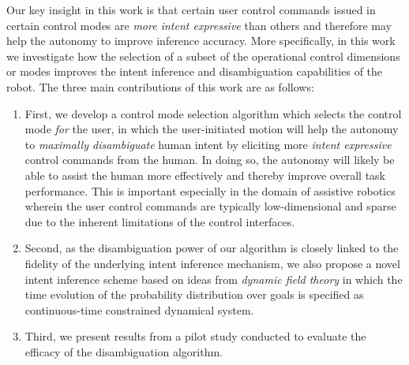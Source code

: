 \documentclass[journal]{IEEEtran}
\begin{document}
Our key insight in this work is that certain user control commands issued in certain control modes are \textit{more intent expressive} than others and therefore may help the autonomy to improve inference accuracy. 
More specifically, in this work we investigate how the selection of a subset of the operational control dimensions or modes improves the intent inference and disambiguation capabilities of the robot. 
The three main contributions of this work are as follows:
\begin{enumerate}
	\item First, we develop a control mode selection algorithm which selects the control mode \textit{for} the user, in which the user-initiated motion will help the autonomy to \textit{maximally disambiguate} human intent by eliciting more \textit{intent expressive} control commands from the human. In doing so, the autonomy will likely be able to assist the human more effectively and thereby improve overall task performance. This is important especially in the domain of assistive robotics wherein the user control commands are typically low-dimensional and sparse due to the inherent limitations of the control interfaces. 
	\item Second, as the disambiguation power of our algorithm is closely linked to the fidelity of the underlying intent inference mechanism, we also propose a novel intent inference scheme based on ideas from \textit{dynamic field theory} in which the time evolution of the probability distribution over goals is specified as continuous-time constrained dynamical system.
	\item Third, we present results from a pilot study conducted to evaluate the efficacy of the disambiguation algorithm.
\end{enumerate}
\end{document}
